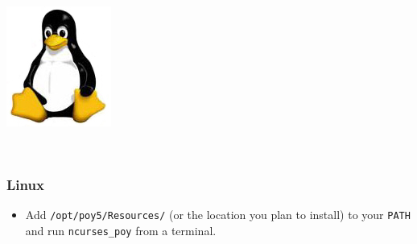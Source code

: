 {\begin{flushleft}
	\begin{minipage}[c]{0.074\textwidth}
   		\includegraphics[width=\textwidth]{doc/figures/figlogolinux.jpg}
	\end{minipage}
	\,
	\begin{minipage}[t]{0.88\textwidth}
	   	\subsubsection*{Linux}
	\end{minipage}
	\begin{itemize}
    		\item Add \texttt{/opt/poy5/Resources/} (or the location you plan to install) to your \texttt{PATH} and run
    \texttt{ncurses\_poy} from a terminal.
    	\end{itemize}
\end{flushleft}

}
